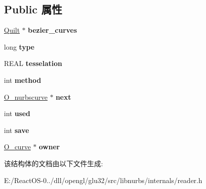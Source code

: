\subsection*{Public 属性}
\begin{DoxyCompactItemize}
\item 
\mbox{\label{struct_o__nurbscurve_af075e456fce14537227225e004477f67}} 
\hyperlink{class_quilt}{Quilt} $\ast$ {\bfseries bezier\+\_\+curves}
\item 
\mbox{\label{struct_o__nurbscurve_a1fe718494cecf3515d11de0dd7b747ec}} 
long {\bfseries type}
\item 
\mbox{\label{struct_o__nurbscurve_ae8d048133cb51a56f6e2c5a4f46ca3a3}} 
R\+E\+AL {\bfseries tesselation}
\item 
\mbox{\label{struct_o__nurbscurve_af654c5dee782c183927ca52ff49a3560}} 
int {\bfseries method}
\item 
\mbox{\label{struct_o__nurbscurve_acdd73e4686aca3440f71349c93f12575}} 
\hyperlink{struct_o__nurbscurve}{O\+\_\+nurbscurve} $\ast$ {\bfseries next}
\item 
\mbox{\label{struct_o__nurbscurve_a7a05c402083ab669bb65289231d2e4f1}} 
int {\bfseries used}
\item 
\mbox{\label{struct_o__nurbscurve_a52b22b6b7e9281e8294bed14e2f74db6}} 
int {\bfseries save}
\item 
\mbox{\label{struct_o__nurbscurve_a3d6c234a2b0247341f1d127c1f75406e}} 
\hyperlink{struct_o__curve}{O\+\_\+curve} $\ast$ {\bfseries owner}
\end{DoxyCompactItemize}


该结构体的文档由以下文件生成\+:\begin{DoxyCompactItemize}
\item 
E\+:/\+React\+O\+S-\/0../dll/opengl/glu32/src/libnurbs/internals/reader.\+h\end{DoxyCompactItemize}
